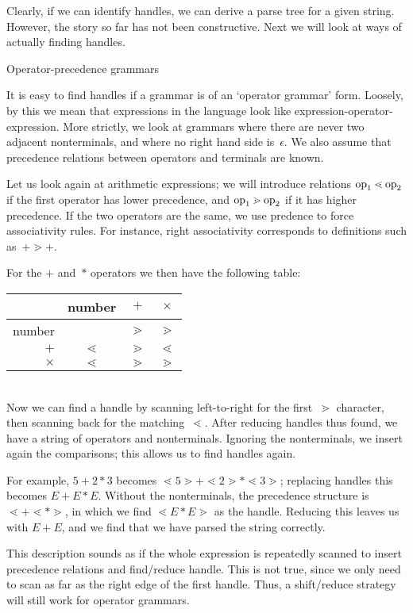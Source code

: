 Clearly, if we can identify handles, we can derive a parse tree for a
given string. However, the story so far has not been constructive.
Next we will look at ways of actually finding handles.

 {Operator-precedence grammars}

It is easy to find handles if a grammar is of an `operator grammar'
form. Loosely, by this we mean that expressions in the language look
like expression-operator-expression. More strictly, we look at
grammars where there are never two adjacent nonterminals, and where no
right hand side is~$\epsilon$. We also assume that precedence
relations between operators and terminals are known.

Let us look again at arithmetic expressions; we will introduce
relations $\hbox{op}_1\lessdot\hbox{op}_2$ if the first operator has lower
precedence, and $\hbox{op}_1\gtrdot\hbox{op}_2$ if it has higher
precedence. If the two operators are the same, we use predence to
force associativity rules. For instance, right associativity
corresponds to definitions such as~$+\gtrdot+$.

For the $+$ and~$*$ operators we then have the following table:\\
\begin{tabular}{r|ccc}
&\hbox{number}&$+$&$\times$\\\hline
\hbox{number}&&$\gtrdot$&$\gtrdot$\\
$+$&$\lessdot$&$\gtrdot$&$\lessdot$\\
$\times$&$\lessdot$&$\gtrdot$&$\gtrdot$
\end{tabular}\\
Now we can find a handle by scanning left-to-right for the first~$\gtrdot$
character, then scanning back for the matching~$\lessdot$. After reducing
handles thus found, we have a string of operators and
nonterminals. Ignoring the nonterminals, we insert again the
comparisons; this allows us to find handles again.

For example, $5+2*3$ becomes
$\lessdot5\gtrdot+\lessdot2\gtrdot*\lessdot3\gtrdot$; replacing
handles this becomes $E+E*E$. Without the nonterminals, the precedence
structure is ${\lessdot}+{\lessdot}*{\gtrdot}$, in which we find
${\lessdot}E*E{\gtrdot}$ as the handle. Reducing this leaves us with
$E+E$, and we find that we have parsed the string correctly.

This description sounds as if the whole expression is repeatedly
scanned to insert precedence relations and find/reduce handle. This is
not true, since we only need to scan as far as the right edge of the
first handle. Thus, a shift/reduce strategy will still work for
operator grammars.

